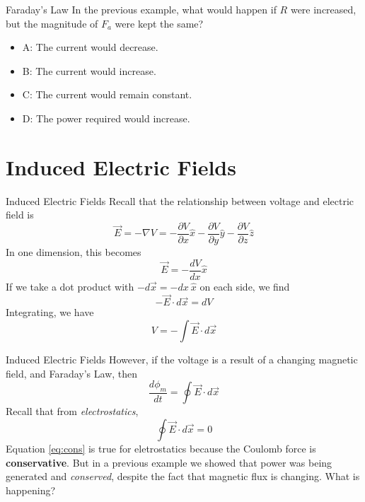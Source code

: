 \documentclass{beamer}
\begin{document}
\begin{frame}{Faraday's Law}
In the previous example, what would happen if $R$ were increased, but the magnitude of $F_a$ were kept the same?
\begin{itemize}
\item A: The current would decrease.
\item B: The current would increase.
\item C: The current would remain constant.
\item D: The power required would increase.
\end{itemize}
\end{frame}

\section{Induced Electric Fields}

\begin{frame}{Induced Electric Fields}
Recall that the relationship between voltage and electric field is
\begin{equation}
\vec{E} = - \nabla V = -\frac{\partial V}{\partial x}\hat{x}-\frac{\partial V}{\partial y}\hat{y}-\frac{\partial V}{\partial z}\hat{z}
\end{equation}
In one dimension, this becomes
\begin{equation}
\vec{E} = -\frac{dV}{dx}\hat{x}
\end{equation}
If we take a dot product with $- d\vec{x} = - dx ~ \hat{x}$ on each side, we find
\begin{equation}
-\vec{E} \cdot d\vec{x} = dV
\end{equation}
Integrating, we have
\begin{equation}
V = - \int \vec{E} \cdot d\vec{x}
\end{equation}
\end{frame}

\begin{frame}{Induced Electric Fields}
However, if the voltage is a result of a changing magnetic field, and Faraday's Law, then
\begin{equation}
\frac{d\phi_m}{dt} = \oint \vec{E} \cdot d\vec{x}
\end{equation}
Recall that from \textit{electrostatics},
\begin{equation}
\oint \vec{E} \cdot d\vec{x} = 0 \label{eq:cons}
\end{equation}
Equation \ref{eq:cons} is true for eletrostatics because the Coulomb force is \textbf{conservative}.  But in a previous example we showed that power was being generated and \textit{conserved}, despite the fact that magnetic flux is changing.  What is happening?
\end{frame}
\end{document}
